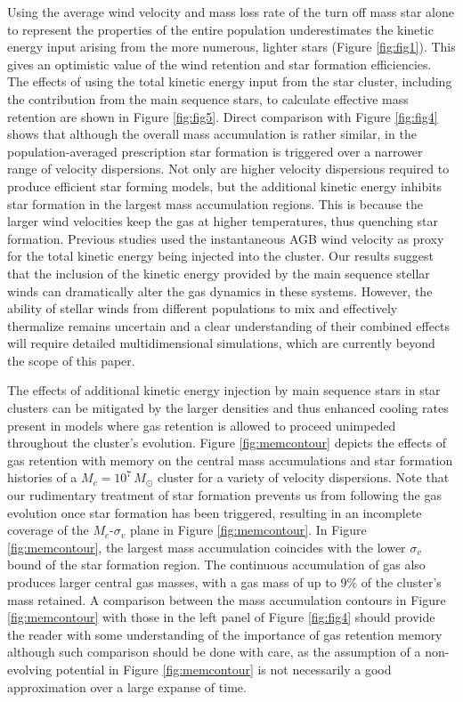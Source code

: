 \documentclass[fleqn,usenatbib]{mnras}
\begin{document}
Using the average wind velocity and mass loss rate  of the turn off mass star alone to represent the properties of the entire population underestimates  the kinetic energy 
input arising  from the more numerous, lighter stars (Figure \ref{fig:fig1}). This  gives  an  optimistic  value  of the  wind retention and star formation efficiencies.
The effects of using  the total kinetic energy input from the star cluster, including the contribution from the main sequence stars, to calculate effective mass retention  are shown in  Figure \ref{fig:fig5}.  Direct comparison  with Figure \ref{fig:fig4} shows that although  the overall mass accumulation is rather similar, in the population-averaged prescription  star formation is triggered over a narrower range of velocity 
dispersions.  Not only are higher velocity dispersions required to produce efficient star forming models, but the additional kinetic energy  inhibits star formation in the largest mass accumulation regions.  This is because  the larger wind velocities keep the gas at higher  temperatures, thus quenching  star formation.  
Previous  studies used the instantaneous AGB wind velocity as proxy for the total kinetic energy being injected into the cluster.  Our results suggest that the inclusion of the kinetic energy provided by  the main sequence stellar winds  can dramatically alter the gas dynamics in 
these systems.  However, the ability of stellar winds from  different populations to mix and effectively thermalize remains uncertain and a clear understanding of their combined effects  will  require detailed multidimensional simulations, which are currently beyond the scope of this paper.

The effects of additional kinetic energy injection by main sequence stars in star clusters can be mitigated by the larger densities and thus enhanced  cooling rates present in models where gas retention is allowed to proceed unimpeded  throughout the cluster's evolution.  Figure \ref{fig:memcontour} depicts the effects of gas retention with memory on the central mass accumulations and star formation histories of a $M_c = 10^7 \, M_\odot$ cluster for a variety of velocity dispersions.  Note that our rudimentary  treatment of star formation prevents us from following the gas evolution once star formation has been triggered, resulting in an incomplete coverage of the $M_c$-$\sigma_v$ plane in Figure \ref{fig:memcontour}. In Figure \ref{fig:memcontour}, the largest mass accumulation coincides with the lower $\sigma_v$ bound of the star formation region.  The continuous accumulation of gas also produces larger central gas masses, with a gas mass of up to $9\%$ of the cluster's mass retained.  A  comparison between the mass accumulation contours in Figure \ref{fig:memcontour} with those in the left panel of Figure \ref{fig:fig4} should provide the reader with some understanding of the importance of gas retention memory  although such comparison should be done with care, as the assumption of a non-evolving potential in Figure \ref{fig:memcontour} is not necessarily a good approximation over a large expanse of time.
\end{document}
